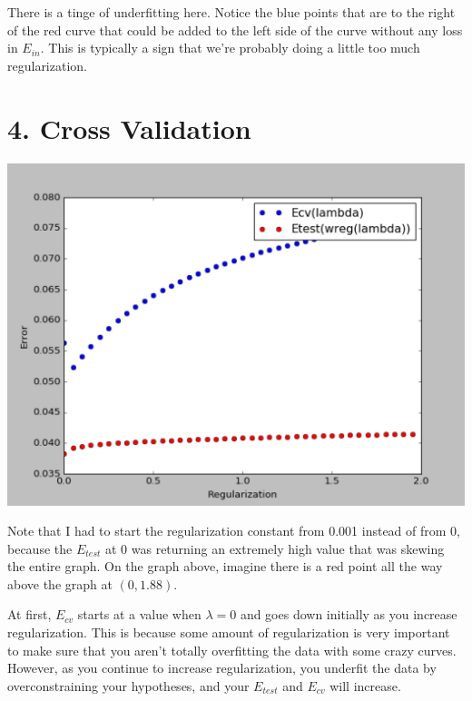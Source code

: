 \documentclass[12pt]{article}
\begin{document}
There is a tinge of underfitting here. Notice the blue points that are to the right of the red curve that could be added to the left side of the curve without any loss in $E_{in}$. This is typically a sign that we're probably doing a little too much regularization.

\section*{4. Cross Validation}
\includegraphics[scale=.5]{4-1.png}

Note that I had to start the regularization constant from 0.001 instead of from 0, because the $E_{test}$ at 0 was returning an extremely high value that was skewing the entire graph. On the graph above, imagine there is a red point all the way above the graph at $(0, 1.88)$.

At first, $E_{cv}$ starts at a value when $\lambda = 0$ and goes down initially as you increase regularization. This is because some amount of regularization is very important to make sure that you aren't totally overfitting the data with some crazy curves. However, as you continue to increase regularization, you underfit the data by overconstraining your hypotheses, and your $E_{test}$ and $E_{cv}$ will increase.
\end{document}
